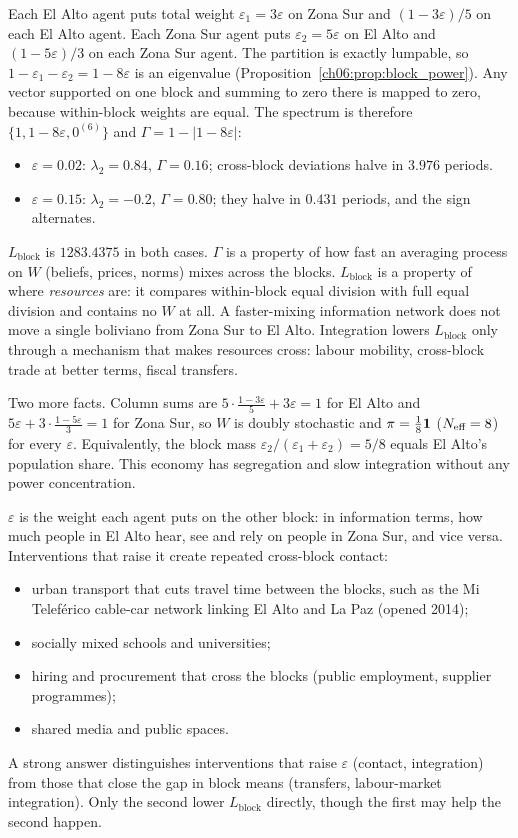 \documentclass[../solutions_manual.tex]{subfiles}
\begin{document}
 Each El Alto agent puts total weight $\varepsilon_1 = 3\varepsilon$ on Zona Sur and $(1 - 3\varepsilon)/5$ on each El Alto agent. Each Zona Sur agent puts $\varepsilon_2 = 5\varepsilon$ on El Alto and $(1 - 5\varepsilon)/3$ on each Zona Sur agent. The partition is exactly lumpable, so $1 - \varepsilon_1 - \varepsilon_2 = 1 - 8\varepsilon$ is an eigenvalue (Proposition~\ref{ch06:prop:block_power}). Any vector supported on one block and summing to zero there is mapped to zero, because within-block weights are equal. The spectrum is therefore $\{1, 1 - 8\varepsilon, 0^{(6)}\}$ and $\Gamma = 1 - |1 - 8\varepsilon|$:
\begin{itemize}
\item $\varepsilon = 0.02$: $\lambda_2 = 0.84$, $\Gamma = 0.16$; cross-block deviations halve in $3.976$ periods.
\item $\varepsilon = 0.15$: $\lambda_2 = -0.2$, $\Gamma = 0.80$; they halve in $0.431$ periods, and the sign alternates.
\end{itemize}
$L_{\text{block}}$ is $1283.4375$ in both cases. $\Gamma$ is a property of how fast an averaging process on $W$ (beliefs, prices, norms) mixes across the blocks. $L_{\text{block}}$ is a property of where \emph{resources} are: it compares within-block equal division with full equal division and contains no $W$ at all. A faster-mixing information network does not move a single boliviano from Zona Sur to El Alto. Integration lowers $L_{\text{block}}$ only through a mechanism that makes resources cross: labour mobility, cross-block trade at better terms, fiscal transfers.

Two more facts. Column sums are $5\cdot\frac{1 - 3\varepsilon}{5} + 3\varepsilon = 1$ for El Alto and $5\varepsilon + 3\cdot\frac{1-5\varepsilon}{3} = 1$ for Zona Sur, so $W$ is doubly stochastic and $\pi = \frac18\mathbf{1}$ ($N_{\text{eff}} = 8$) for every $\varepsilon$. Equivalently, the block mass $\varepsilon_2/(\varepsilon_1 + \varepsilon_2) = 5/8$ equals El Alto's population share. This economy has segregation and slow integration without any power concentration.

 $\varepsilon$ is the weight each agent puts on the other block: in information terms, how much people in El Alto hear, see and rely on people in Zona Sur, and vice versa. Interventions that raise it create repeated cross-block contact:
\begin{itemize}
\item urban transport that cuts travel time between the blocks, such as the Mi Telef\'erico cable-car network linking El Alto and La Paz (opened 2014);
\item socially mixed schools and universities;
\item hiring and procurement that cross the blocks (public employment, supplier programmes);
\item shared media and public spaces.
\end{itemize}
A strong answer distinguishes interventions that raise $\varepsilon$ (contact, integration) from those that close the gap in block means (transfers, labour-market integration). Only the second lower $L_{\text{block}}$ directly, though the first may help the second happen.
\end{document}
